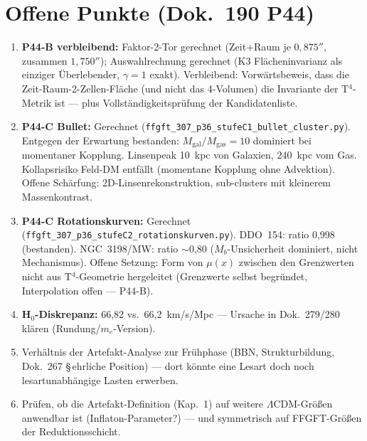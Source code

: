 \documentclass[11pt]{report}
\begin{document}
\chapter{Offene Punkte (Dok.~190 P44)}

\begin{enumerate}
  \item \textbf{P44-B verbleibend:} Faktor-2-Tor gerechnet (Zeit$+$Raum je
        $0{,}875''$, zusammen $1{,}750''$); Auswahlrechnung gerechnet
        (K3 Flächeninvarianz als einziger Überlebender, $\gamma = 1$ exakt).
        Verbleibend: Vorwärtsbeweis, dass die Zeit-Raum-2-Zellen-Fläche
        (und nicht das 4-Volumen) die Invariante der T$^4$-Metrik ist —
        plus Vollständigkeitsprüfung der Kandidatenliste.
  \item \textbf{P44-C Bullet:} Gerechnet (\texttt{ffgft\_307\_p36\_stufeC1\_bullet\_cluster.py}).
        Entgegen der Erwartung bestanden: $M_\text{gal}/M_\text{gas}=10$
        dominiert bei momentaner Kopplung. Linsenpeak 10~kpc von Galaxien,
        240~kpc vom Gas. Kollapsrisiko Feld-DM entfällt (momentane Kopplung
        ohne Advektion). Offene Schärfung: 2D-Linsenrekonstruktion,
        sub-clusters mit kleinerem Massenkontrast.
  \item \textbf{P44-C Rotationskurven:} Gerechnet (\texttt{ffgft\_307\_p36\_stufeC2\_rotationskurven.py}).
        DDO~154: ratio 0{,}998 (bestanden). NGC~3198/MW: ratio $\sim$0{,}80
        ($M_b$-Unsicherheit dominiert, nicht Mechanismus).
        Offene Setzung: Form von $\mu(x)$ zwischen den Grenzwerten
        nicht aus T$^4$-Geometrie hergeleitet (Grenzwerte selbst begründet,
        Interpolation offen — P44-B).
  \item \textbf{H$_0$-Diskrepanz:} 66{,}82 vs.\ 66{,}2~km/s/Mpc —
        Ursache in Dok.~279/280 klären (Rundung/$m_e$-Version).
  \item Verhältnis der Artefakt-Analyse zur Frühphase (BBN,
        Strukturbildung, Dok.~267 §\,ehrliche Position) — dort könnte
        eine Lesart doch noch lesartunabhängige Lasten erwerben.
  \item Prüfen, ob die Artefakt-Definition (Kap.~1) auf weitere
        $\Lambda$CDM-Größen anwendbar ist (Inflaton-Parameter?) —
        und symmetrisch auf FFGFT-Größen der Reduktionsschicht.
\end{enumerate}

\end{document}
